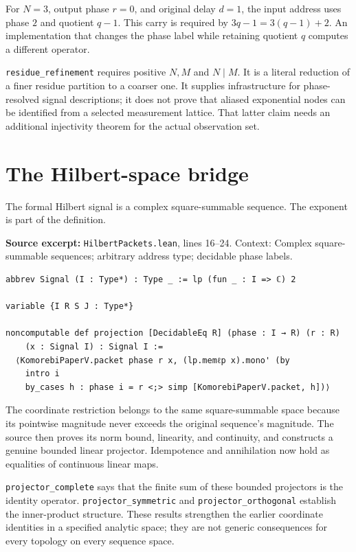 \documentclass[11pt]{article}
\begin{document}
For \(N=3\), output phase \(r=0\), and original delay \(d=1\), the input address uses phase \(2\) and quotient \(q-1\). This carry is required by \(3q-1=3(q-1)+2\). An implementation that changes the phase label while retaining quotient \(q\) computes a different operator.

\texttt{residue\_refinement} requires positive \(N,M\) and \(N\mid M\). It is a literal reduction of a finer residue partition to a coarser one. It supplies infrastructure for phase-resolved signal descriptions; it does not prove that aliased exponential nodes can be identified from a selected measurement lattice. That latter claim needs an additional injectivity theorem for the actual observation set.

\hypertarget{the-hilbert-space-bridge}{%
\section{The Hilbert-space bridge}\label{the-hilbert-space-bridge}}

The formal Hilbert signal is a complex square-summable sequence. The exponent is part of the definition.

\textbf{Source excerpt:} \texttt{HilbertPackets.lean}, lines 16--24. Context: Complex square-summable sequences; arbitrary address type; decidable phase labels.

\begin{minipage}{\linewidth}
\begin{lstlisting}
abbrev Signal (I : Type*) : Type _ := lp (fun _ : I => ℂ) 2

variable {I R S J : Type*}

noncomputable def projection [DecidableEq R] (phase : I → R) (r : R)
    (x : Signal I) : Signal I :=
  ⟨KomorebiPaperV.packet phase r x, (lp.memℓp x).mono' (by
    intro i
    by_cases h : phase i = r <;> simp [KomorebiPaperV.packet, h])⟩
\end{lstlisting}
\end{minipage}\par

The coordinate restriction belongs to the same square-summable space because its pointwise magnitude never exceeds the original sequence's magnitude. The source then proves its norm bound, linearity, and continuity, and constructs a genuine bounded linear projector. Idempotence and annihilation now hold as equalities of continuous linear maps.

\texttt{projector\_complete} says that the finite sum of these bounded projectors is the identity operator. \texttt{projector\_symmetric} and \texttt{projector\_orthogonal} establish the inner-product structure. These results strengthen the earlier coordinate identities in a specified analytic space; they are not generic consequences for every topology on every sequence space.
\end{document}

